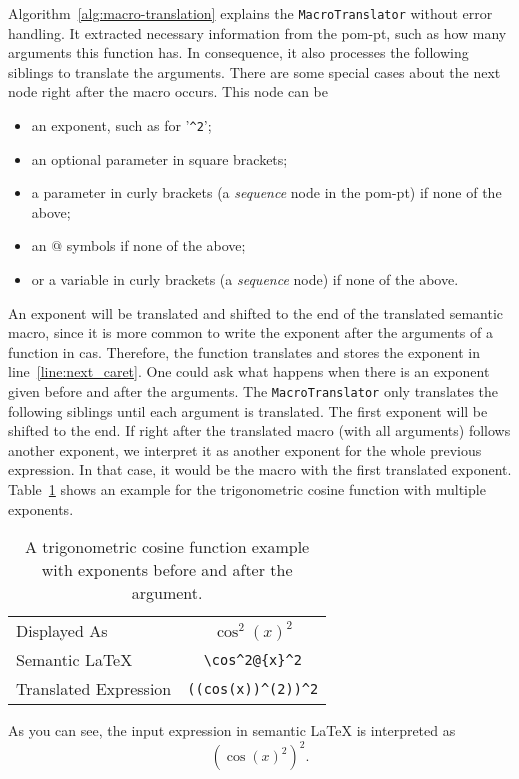 Algorithm~\ref{alg:macro-translation} explains the \verb|MacroTranslator| without error handling. It extracted necessary information from the \gls*{pom-pt}, such as how many arguments this function has. In consequence, it also processes the following siblings to translate the arguments. There are some special cases about the next node right after the macro occurs. This node can be
\begin{itemize}
\item an exponent, such as for '\verb|^2|';
\item an optional parameter in square brackets;
\item a parameter in curly brackets (a \textit{sequence} node in the \gls*{pom-pt}) if none of the above;
\item an $@$ symbols if none of the above;
\item or a variable in curly brackets (a \textit{sequence} node) if none of the above.
\end{itemize}

An exponent will be translated and shifted to the end of the translated semantic macro, since it is more common to write the exponent after the arguments of a function in \gls*{cas}. Therefore, the function translates and stores the exponent in line~\ref{line:next_caret}. One could ask what happens when there is an exponent given before and after the arguments. The \verb|MacroTranslator| only translates the following siblings until each argument is translated. The first exponent will be shifted to the end. If right after the translated macro (with all arguments) follows another exponent, we interpret it as another exponent for the whole previous expression. In that case, it would be the macro with the first translated exponent. Table~\ref{tab:multi-expo} shows an example for the trigonometric cosine function with multiple exponents. 
\begin{table}[ht]
\centering
\begin{tabular}{lc}
\hline
Displayed As & \rule{0pt}{0.9\normalbaselineskip} $\cos^2(x)^2$ \\
Semantic \LaTeX & \verb|\cos^2@{x}^2| \\
Translated \Maple{} Expression & \verb|((cos(x))^(2))^2|\\
\hline
\end{tabular}
\caption{A trigonometric cosine function example with exponents before and after the argument.}
\label{tab:multi-expo}
\end{table}

As you can see, the input expression in semantic \LaTeX{} is interpreted as
\begin{equation}\label{eq:multi-expo}
\left( \cos(x)^2 \right)^2.
\end{equation}
